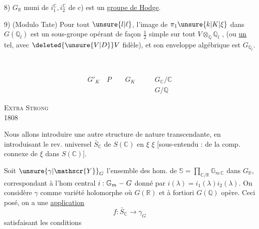 
8) $G_{\mathbb R}$ muni de $i_1^{\mathbb C},i_2^{\mathbb C}$ de c) est un \uline{groupe de Hodge}.

9) (Modulo Tate) Pour tout $\unsure{l|\ell}$, l'image de $\pi_1\unsure{k|K|\xi}$ dans $G(\mathbb Q_l)$ est un sous-groupe opérant de façon $\frac12$ simple sur tout  $V\otimes_{\mathbb Q}\mathbb Q_l$ , (ou \uline{un} tel, avec $\deleted{\unsure{V|D}}V$  fidèle), et son enveloppe algébrique est $G_{\mathbb Q_l}$.


{\centering \textsc{ }\\
\textit{ }\par}


\[
\begin{aligned}
G'_{K} \quad P \qquad G_{K} &\qquad G_{\mathbb{C}} / \mathbb{C} \\
                            &\qquad G / \mathbb{Q}
\end{aligned}
\]


\noindent\textsc{Extra Strong}\\
 1808


Nous allons introduire une autre structure de nature transcendante, en introduisant le rev. universel $\bar S_{\mathbb C}$ de $S(\mathbb C)$ en $\xi$ $\xi$ [sous-entendu : de la comp. connexe de $\xi$ dans $S(\mathbb C)$].

Soit $\unsure{\gamma|\mathscr{Y}}_{G}$ l'ensemble des hom. de $\mathbb S=\prod_{\mathbb C/\mathbb R}\mathbb G_{m\,\mathbb C}$ dans $G_{\mathbb R}$, correspondant à l'hom central  $i:\mathbb G_m \relbar G$ donné par $i(\lambda)=i_1(\lambda)i_2(\lambda)$. \margin{\rule{0.35pt}{2.1\baselineskip}}On considère $\gamma$ comme variété  holomorphe où  $G(\mathbb R)$ et à fortiori $G(\mathbb Q)$ opère. Ceci posé, on a une \uline{application}
\[
\boxed{f:\bar S_{\mathbb C}\longrightarrow\gamma_G}
\]
satisfaisant les conditions

